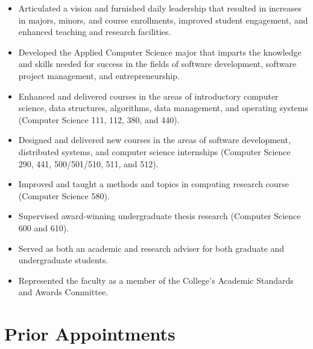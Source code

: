 \documentclass[11pt,letterpaper,sans]{moderncv/moderncv}
\begin{document}
{\begin{itemize}
    \renewcommand\labelitemi{\Large\textbullet}
    \item Articulated a vision and furnished daily leadership that resulted in increases in majors, minors, and
      course enrollments, improved student engagement, and enhanced teaching and research facilities.
    \item Developed the Applied Computer Science major that imparts the knowledge and skills needed for success in the
      fields of software development, software project management, and entrepreneurship.
    \item Enhanced and delivered courses in the areas of introductory computer science, data structures,
      algorithms, data management, and operating systems (Computer Science 111, 112, 380, and 440).
    \item Designed and delivered new courses in the areas of software development, distributed systems, and computer
      science internships (Computer Science 290, 441, 500/501/510, 511, and 512).
    \item Improved and taught a methods and topics in computing research course (Computer Science
        580).
    \item Supervised award-winning undergraduate thesis research (Computer Science 600 and 610).
    \item Served as both an academic and research adviser for both graduate and undergraduate students.
    \item Represented the faculty as a member of the College's Academic Standards and Awards Committee.
  \end{itemize}}

\vspace*{-.1in}
\section{Prior Appointments}


\end{document}
